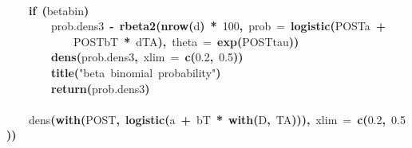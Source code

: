 \documentclass{article}
\makeatletter
\newcommand{\hlnumber}[1]{\textcolor[rgb]{0,0,0}{#1}}%
\newcommand{\hlfunctioncall}[1]{\textcolor[rgb]{.5,0,.33}{\textbf{#1}}}%
\newcommand{\hlstring}[1]{\textcolor[rgb]{.6,.6,1}{#1}}%
\newcommand{\hlkeyword}[1]{\textbf{#1}}%
\newcommand{\hlargument}[1]{\textcolor[rgb]{.69,.25,.02}{#1}}%
\newcommand{\hlassignement}[1]{\textbf{#1}}%
\newcommand{\hlsymbol}[1]{#1}%
\newcommand{\hlstd}[1]{\textcolor[rgb]{0,0,0}{#1}}%
\newenvironment{kframe}{%
 \def\FrameCommand##1{\hskip\@totalleftmargin \hskip-\fboxsep
 \colorbox{shadecolor}{##1}\hskip-\fboxsep
     \hskip-\linewidth \hskip-\@totalleftmargin \hskip\columnwidth}%
 \MakeFramed {\advance\hsize-\width
   \@totalleftmargin\z@ \linewidth\hsize
   \@setminipage}}%
 {\par\unskip\endMakeFramed}
\newenvironment{knitrout}{}{} %
\makeatother
\begin{document}
\begin{knitrout}
{\begin{kframe}
\begin{flushleft}
\hlstd{}\hspace*{\fill}\\
\hlstd{}{\ }{\ }{\ }{\ }\hlkeyword{if}{\ }\hlkeyword{(}\hlsymbol{betabin}\hlkeyword{)}{\ }\hlkeyword{\usebox{\hlnormalsizeboxopenbrace}}\hspace*{\fill}\\
\hlstd{}{\ }{\ }{\ }{\ }{\ }{\ }{\ }{\ }\hlsymbol{prob.dens3}{\ }\hlassignement{\usebox{\hlnormalsizeboxlessthan}-}{\ }\hlfunctioncall{rbeta2}\hlkeyword{(}\hlfunctioncall{nrow}\hlkeyword{(}\hlsymbol{d}\hlkeyword{)}{\ }\hlkeyword{*}{\ }\hlnumber{100}\hlkeyword{,}{\ }\hlargument{prob}{\ }\hlargument{=}{\ }\hlfunctioncall{logistic}\hlkeyword{(}\hlsymbol{POST}\hlkeyword{\usebox{\hlnormalsizeboxdollar}}\hlsymbol{a}{\ }\hlkeyword{+}\hspace*{\fill}\\
\hlstd{}{\ }{\ }{\ }{\ }{\ }{\ }{\ }{\ }{\ }{\ }{\ }{\ }\hlsymbol{POST}\hlkeyword{\usebox{\hlnormalsizeboxdollar}}\hlsymbol{bT}{\ }\hlkeyword{*}{\ }\hlsymbol{d}\hlkeyword{\usebox{\hlnormalsizeboxdollar}}\hlsymbol{TA}\hlkeyword{)}\hlkeyword{,}{\ }\hlargument{theta}{\ }\hlargument{=}{\ }\hlfunctioncall{exp}\hlkeyword{(}\hlsymbol{POST}\hlkeyword{\usebox{\hlnormalsizeboxdollar}}\hlsymbol{tau}\hlkeyword{)}\hlkeyword{)}\hspace*{\fill}\\
\hlstd{}{\ }{\ }{\ }{\ }{\ }{\ }{\ }{\ }\hlfunctioncall{dens}\hlkeyword{(}\hlsymbol{prob.dens3}\hlkeyword{,}{\ }\hlargument{xlim}{\ }\hlargument{=}{\ }\hlfunctioncall{c}\hlkeyword{(}\hlnumber{0.2}\hlkeyword{,}{\ }\hlnumber{0.5}\hlkeyword{)}\hlkeyword{)}\hspace*{\fill}\\
\hlstd{}{\ }{\ }{\ }{\ }{\ }{\ }{\ }{\ }\hlfunctioncall{title}\hlkeyword{(}\hlstring{"beta{\ }binomial{\ }probability"}\hlkeyword{)}\hspace*{\fill}\\
\hlstd{}{\ }{\ }{\ }{\ }{\ }{\ }{\ }{\ }\hlfunctioncall{return}\hlkeyword{(}\hlsymbol{prob.dens3}\hlkeyword{)}\hspace*{\fill}\\
\hlstd{}{\ }{\ }{\ }{\ }\hlkeyword{\usebox{\hlnormalsizeboxclosebrace}}\hspace*{\fill}\\
\hlstd{}{\ }{\ }{\ }{\ }\hlsymbol{dens}\hlfunctioncall{}\hlkeyword{(}\hlfunctioncall{with}\hlkeyword{(}\hlsymbol{POST}\hlkeyword{,}{\ }\hlfunctioncall{logistic}\hlkeyword{(}\hlsymbol{a}{\ }\hlkeyword{+}{\ }\hlsymbol{bT}{\ }\hlkeyword{*}{\ }\hlfunctioncall{with}\hlkeyword{(}\hlsymbol{D}\hlkeyword{,}{\ }\hlsymbol{TA}\hlkeyword{)}\hlkeyword{)}\hlkeyword{)}\hlkeyword{,}{\ }\hlargument{xlim}{\ }\hlargument{=}{\ }\hlfunctioncall{c}\hlkeyword{(}\hlnumber{0.2}\hlkeyword{,}{\ }\hlnumber{0.5}\hlkeyword{)}\hlkeyword{)}\hspace*{\fill}\\

\end{flushleft}
\end{kframe}}
\end{knitrout}
\end{document}
